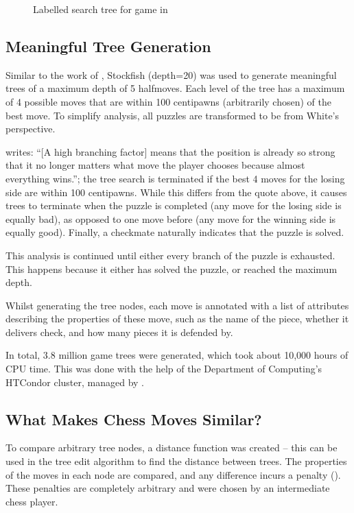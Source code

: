 \begin{figure}[H]
\begin{minipage}{0.475\textwidth}
    \caption{Labelled search tree for game in }
    \label{tree2}
  \end{minipage}
\end{figure}

\subsection{Meaningful Tree Generation}\label{treeS12}

Similar to the work of \citet{chessTrees}, Stockfish (depth=20) was used to
generate meaningful trees of a maximum depth of 5 halfmoves. Each level of the
tree has a maximum of 4 possible moves that are within 100 centipawns
(arbitrarily chosen) of the best move. To simplify analysis, all puzzles are
transformed to be from White's perspective.

\citet{chessTrees} writes: ``[A high branching factor] means that the position
is already so strong that it no longer matters what move the player chooses
because almost everything wins.''; the tree search is terminated if the best 4
moves for the losing side are within 100 centipawns. While this differs from
the quote above, it causes trees to terminate when the puzzle is completed (any
move for the losing side is equally bad), as opposed to one move before (any
move for the winning side is equally good). Finally, a checkmate naturally
indicates that the puzzle is solved. 

This analysis is continued until either every branch of the puzzle is
exhausted. This happens because it either has solved the puzzle, or reached the
maximum depth.

Whilst generating the tree nodes, each move is annotated with a list of
attributes describing the properties of these move, such as the name of the
piece, whether it delivers check, and how many pieces it is defended by.

In total, 3.8 million game trees were generated, which took about 10,000 hours
of CPU time. This was done with the help of the Department of Computing's
HTCondor cluster, managed by \citet{csgCondor}.

\subsection{What Makes Chess Moves Similar?}\label{treeS13}

To compare arbitrary tree nodes, a distance function was created -- this can be
used in the tree edit algorithm to find the distance between trees. The
properties of the moves in each node are compared, and any difference incurs a
penalty (). These penalties are completely arbitrary and
were chosen by an intermediate chess player.

